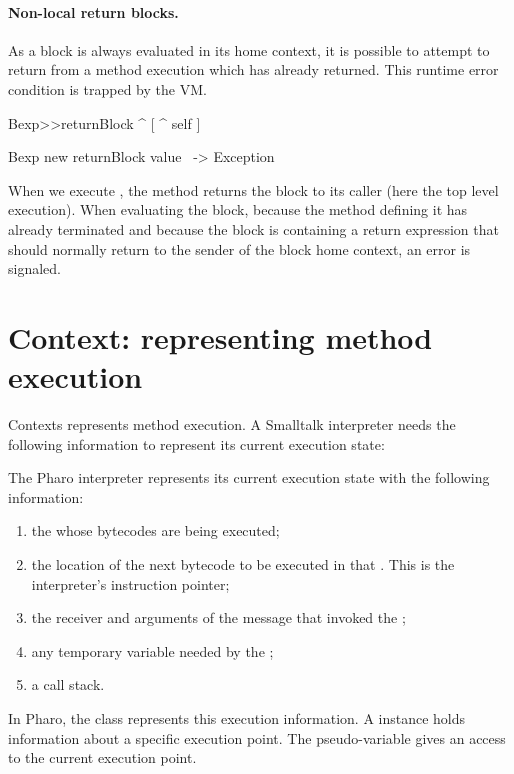 \documentclass[a4paper,10pt,twoside]{book}
\begin{document}
\paragraph{Non-local return blocks.} As a block is always evaluated in its home context, it is possible to attempt to return from a method execution which has already returned. This runtime error condition is trapped by the VM.

\begin{code}{}
Bexp>>returnBlock
	^ [ ^ self ]

Bexp new returnBlock value ~-> Exception
\end{code}

When we execute , the method returns the block to its caller (here the top level execution). When evaluating the block, because the method defining it has already terminated and because the block is containing a return expression that should normally   return to the sender of the block home context, an error is signaled.


\section{Context: representing method execution}
Contexts represents method execution. A Smalltalk interpreter needs the following information to represent its current execution state:

The Pharo interpreter represents its current execution state with the following information:

\begin{enumerate}
\item the  whose bytecodes are being executed;
\item the location of the next bytecode to be executed in that
. This is the interpreter's instruction pointer;
\item the receiver and arguments of the message that invoked the
;
\item any temporary variable needed by the ;
\item a call stack.
\end{enumerate}

In Pharo, the class  represents this execution information. A  instance holds information about a specific execution point.  The pseudo-variable  gives an access to the current execution point.
\end{document}
